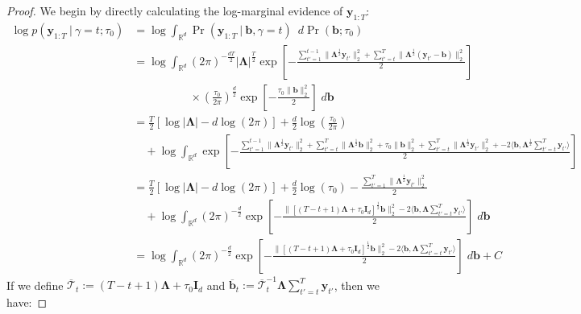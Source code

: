 \begin{proof}
We begin by directly calculating the log-marginal evidence of $\mathbf{y}_{1:T}$: 
\small
\begin{align*}
    \log p(\mathbf{y}_{1:T} \:|\:\gamma = t ; \tau_0) &= \log \int_{\mathbb{R}^d} \Pr(\mathbf{y}_{1:T} \:|\:\mathbf{b},\gamma = t) \:\; d\Pr(\mathbf{b};\tau_0) \\
    &= \log \int_{\mathbb{R}^d} (2\pi)^{-\frac{dT}{2}}|\boldsymbol{\Lambda}|^\frac{T}{2} \exp\left[-\frac{\sum_{t'=1}^{t-1} \lVert\boldsymbol{\Lambda}^{\frac{1}{2}}\mathbf{y}_{t'}\rVert_2^2 + \sum_{t'=t}^{T} \lVert\boldsymbol{\Lambda}^{\frac{1}{2}}(\mathbf{y}_{t'} - \mathbf{b})\rVert_2^2}{2}\right] \\
    &\quad\quad\quad\quad\quad\times \left(\frac{\tau_0}{2\pi}\right)^{\frac{d}{2}}\exp\left[-\frac{\tau_0\lVert\mathbf{b}\rVert_2^2}{2}\right] \; d\mathbf{b} \\
    &= \frac{T}{2}\left[\log|\boldsymbol{\Lambda}| - d\log(2\pi)\right] + \frac{d}{2}\log \left(\frac{\tau_0}{2\pi}\right)\\
    &\quad + \log \int_{\mathbb{R}^d} \exp\left[-\frac{\sum_{t'=1}^{t-1} \lVert\boldsymbol{\Lambda}^{\frac{1}{2}}\mathbf{y}_{t'}\rVert_2^2 + \sum_{t'=t}^{T} \lVert\boldsymbol{\Lambda}^{\frac{1}{2}}\mathbf{b}\rVert_2^2 +\tau_0 \lVert\mathbf{b}\rVert_2^2 + \sum_{t'=t}^{T} \lVert\boldsymbol{\Lambda}^{\frac{1}{2}}\mathbf{y}_{t'}\rVert_2^2 + -2\langle \mathbf{b}, \boldsymbol{\Lambda}^{\frac{1}{2}} \sum_{t'=t}^T\mathbf{y}_{t'}\rangle}{2}\right] \\
    &=  \frac{T}{2}\left[\log|\boldsymbol{\Lambda}| - d\log(2\pi)\right] + \frac{d}{2}\log \left(\tau_0\right) - \frac{\sum_{t'=1}^T \lVert\boldsymbol{\Lambda}^{\frac{1}{2}}\mathbf{y}_{t'}\rVert_2^2}{2} \\
    &\quad + \log \int_{\mathbb{R}^d} (2\pi)^{-\frac{d}{2}}\exp\left[-\frac{\lVert[(T-t+1)\boldsymbol{\Lambda} + \tau_0\mathbf{I}_d]^{\frac{1}{2}}\mathbf{b}\rVert_2^2-2\langle \mathbf{b}, \boldsymbol{\Lambda} \sum_{t'=t}^T\mathbf{y}_{t'}\rangle}{2}\right] \; d\mathbf{b}\\ 
    &= \log \int_{\mathbb{R}^d} (2\pi)^{-\frac{d}{2}}\exp\left[-\frac{\lVert[(T-t+1)\boldsymbol{\Lambda} + \tau_0\mathbf{I}_d]^{\frac{1}{2}}\mathbf{b}\rVert_2^2-2\langle \mathbf{b}, \boldsymbol{\Lambda} \sum_{t'=t}^T\mathbf{y}_{t'}\rangle}{2}\right] \; d\mathbf{b} + C \tag{$C$ constant independent of $\gamma$}
\end{align*}
\normalsize
If we define $\overline{\boldsymbol{\mathcal{T}}}_t := (T-t+1)\boldsymbol{\Lambda} + \tau_0\mathbf{I}_d$ and $\overline{\mathbf{b}}_t := \overline{\boldsymbol{\mathcal{T}}}_t^{-1} \boldsymbol{\Lambda} \sum_{t'=t}^T \mathbf{y}_{t'}$, then we have:

\end{proof}
